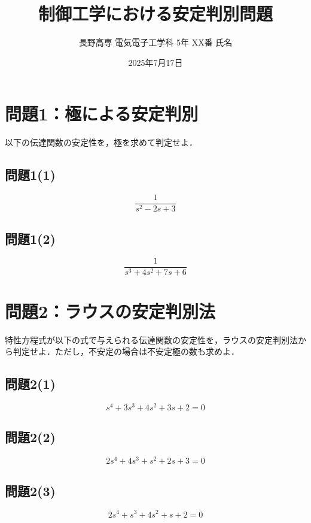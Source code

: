 \documentclass[11pt,a4paper]{ltjsarticle}
\begin{document}
\title{制御工学における安定判別問題}
\author{長野高専 電気電子工学科 5年 XX番 氏名}
\date{2025年7月17日}
\maketitle
\thispagestyle{fancy}

\section{問題1：極による安定判別}

以下の伝達関数の安定性を，極を求めて判定せよ．

\subsection{問題1(1)}
\begin{equation}
\frac{1}{s^2 - 2s + 3}
\end{equation}

\subsection{問題1(2)}
\begin{equation}
\frac{1}{s^3 + 4s^2 + 7s + 6}
\end{equation}

\section{問題2：ラウスの安定判別法}

特性方程式が以下の式で与えられる伝達関数の安定性を，ラウスの安定判別法から判定せよ．ただし，不安定の場合は不安定極の数も求めよ．

\subsection{問題2(1)}
\begin{equation}
s^4 + 3s^3 + 4s^2 + 3s + 2 = 0
\end{equation}

\subsection{問題2(2)}
\begin{equation}
2s^4 + 4s^3 + s^2 + 2s + 3 = 0
\end{equation}

\subsection{問題2(3)}
\begin{equation}
2s^4 + s^3 + 4s^2 + s + 2 = 0
\end{equation}
\end{document}
